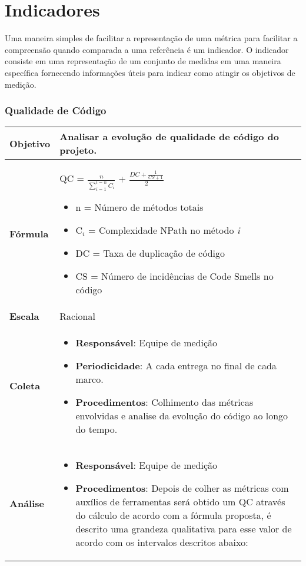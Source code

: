 \chapter{Indicadores}

Uma maneira simples de facilitar a representação de uma métrica para facilitar a compreensão quando comparada a uma referência é um indicador. O indicador consiste em uma representação de um conjunto de medidas em uma maneira específica fornecendo informações úteis para indicar como atingir os objetivos de medição.

\subsection{Qualidade de Código}

   \begin{tabular}{ |p{3cm}|p{12cm}| }
   \hline
    \textbf{Objetivo} & Analisar a evolução de qualidade de código do projeto. \\
   \hline
    \textbf{Fórmula} & QC = $\frac{n}{\sum_{i=1}^{i=n} C_i}$ + $\frac{DC + \frac{1}{CS + 1}}{2}$ \begin{itemize}
			\item n = Número de métodos totais
			\item C$_i$ = Complexidade NPath no método \textit{i}
			\item DC = Taxa de duplicação de código
			\item CS = Número de incidências de Code Smells no código
		\end{itemize}\\
   \hline
    \textbf{Escala} & Racional \\
   \hline
    \textbf{Coleta} & \begin{itemize}
		 \item \textbf{Responsável}: Equipe de medição
     \item \textbf{Periodicidade}: A cada entrega no final de cada marco.
     \item \textbf{Procedimentos}: Colhimento das métricas envolvidas e analise da evolução do código ao longo do tempo.
    \end{itemize} \\
   \hline
    \textbf{Análise} & \begin{itemize} \item \textbf{Responsável}: Equipe de medição
    \item \textbf{Procedimentos}: Depois de colher as métricas com auxílios de ferramentas será obtido um QC através do cálculo de acordo com a fórmula proposta, é descrito uma grandeza qualitativa para esse valor de acordo com os intervalos descritos abaixo:

\end{itemize}
\end{tabular}
